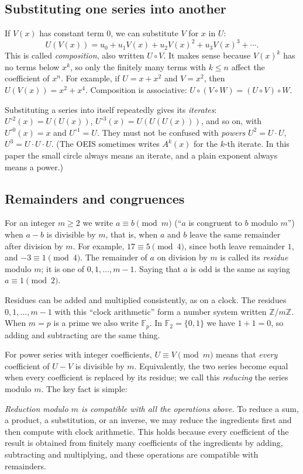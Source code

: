 \documentclass[11pt,a4paper]{article}
\theoremstyle{definition}
\theoremstyle{remark}
\newcommand{\Z}{\mathbb{Z}}
\newcommand{\F}{\mathbb{F}}
\begin{document}
\subsection{Substituting one series into another}
If $V(x)$ has constant term $0$, we can substitute $V$ for $x$ in $U$:
\[
U(V(x))=u_0+u_1V(x)+u_2V(x)^2+u_3V(x)^3+\cdots .
\]
This is called \emph{composition}, also written $U\circ V$. It makes sense because $V(x)^k$ has no terms below $x^k$,
so only the finitely many terms with $k\le n$ affect the coefficient of $x^n$. For example, if $U=x+x^2$ and $V=x^2$, then
$U(V(x))=x^2+x^4$. Composition is associative: $U\circ(V\circ W)=(U\circ V)\circ W$.

Substituting a series into itself repeatedly gives its \emph{iterates}: $U^{\circ2}(x)=U(U(x))$,
$U^{\circ3}(x)=U(U(U(x)))$, and so on, with $U^{\circ0}(x)=x$ and $U^{\circ1}=U$. They must not be confused with
\emph{powers} $U^2=U\cdot U$, $U^3=U\cdot U\cdot U$. (The OEIS sometimes writes $A^k(x)$ for the $k$-th iterate. In
this paper the small circle always means an iterate, and a plain exponent always means a power.)

\subsection{Remainders and congruences}
For an integer $m\ge2$ we write $a\equiv b\pmod m$ (``$a$ is congruent to $b$ modulo $m$'') when $a-b$ is divisible by
$m$, that is, when $a$ and $b$ leave the same remainder after division by $m$. For example, $17\equiv5\pmod 4$, since both leave remainder $1$, and $-3\equiv1\pmod4$. The
remainder of $a$ on division by $m$ is called its \emph{residue} modulo $m$; it is one of $0,1,\dots,m-1$. Saying that
$a$ is odd is the same as saying $a\equiv1\pmod2$.

Residues can be added and multiplied consistently, as on a clock. The residues $0,1,\dots,m-1$ with this ``clock
arithmetic'' form a number system written $\Z/m\Z$. When $m=p$ is a prime we also write $\F_p$. In $\F_2=\{0,1\}$ we
have $1+1=0$, so adding and subtracting are the same thing.

For power series with integer coefficients, $U\equiv V\pmod m$ means that \emph{every} coefficient of $U-V$ is
divisible by $m$. Equivalently, the two series become equal when every coefficient is replaced by its residue; we call
this \emph{reducing} the series modulo $m$. The key fact is simple:

\emph{Reduction modulo $m$ is compatible with all the operations above.} To reduce a sum, a product, a substitution, or
an inverse, we may reduce the ingredients first and then compute with clock arithmetic. This holds because every
coefficient of the result is obtained from finitely many coefficients of the ingredients by adding, subtracting and
multiplying, and these operations are compatible with remainders.
\end{document}
